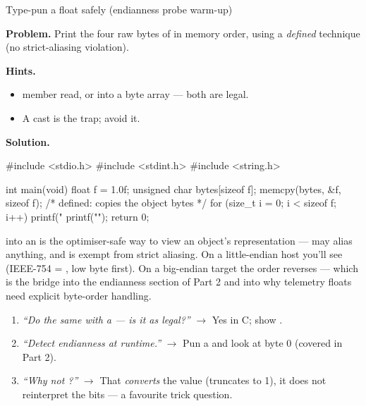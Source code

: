 \begin{gymproblem}{Type-pun a float safely (endianness probe warm-up)}

\textbf{Problem.} Print the four raw bytes of  in memory
order, using a \emph{defined} technique (no strict-aliasing violation).

\textbf{Hints.}
\begin{itemize}
\item {} member read, or  into a byte array --- both
  are legal.
\item A  cast is the trap; avoid it.
\end{itemize}

\attempt

\textbf{Solution.}
\begin{cgym}
#include <stdio.h>
#include <stdint.h>
#include <string.h>

int main(void) {
    float f = 1.0f;
    unsigned char bytes[sizeof f];
    memcpy(bytes, &f, sizeof f);   /* defined: copies the object bytes */
    for (size_t i = 0; i < sizeof f; i++) {
        printf("%
    }
    printf("\n");
    return 0;
}
\end{cgym}

 into an  is the optimiser-safe way to
view an object's representation ---  may alias anything,
and  is exempt from strict aliasing. On a little-endian host
you'll see  (IEEE-754  = , low
byte first). On a big-endian target the order reverses --- which is the
bridge into the endianness section of Part 2 and into why telemetry floats
need explicit byte-order handling.

\followups
\begin{enumerate}
\item \emph{``Do the same with a  --- is it as legal?''}
  $\rightarrow$ Yes in C; show
  .
\item \emph{``Detect endianness at runtime.''} $\rightarrow$ Pun a
   and look at byte 0 (covered in Part 2).
\item \emph{``Why not ?''} $\rightarrow$ That
  \emph{converts} the value (truncates to 1), it does not reinterpret the
  bits --- a favourite trick question.
\end{enumerate}
\end{gymproblem}

